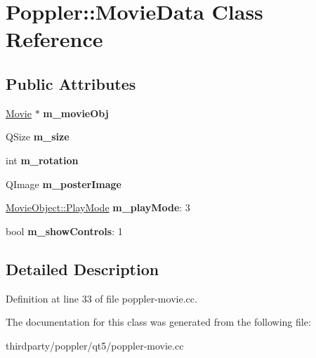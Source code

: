 \hypertarget{class_poppler_1_1_movie_data}{}\section{Poppler\+:\+:Movie\+Data Class Reference}
\label{class_poppler_1_1_movie_data}
\subsection*{Public Attributes}
\begin{DoxyCompactItemize}
\item 
\mbox{\label{class_poppler_1_1_movie_data_a9dbc6037efec1cd0784739c4bb499b8c}} 
\hyperlink{class_movie}{Movie} $\ast$ {\bfseries m\+\_\+movie\+Obj}
\item 
\mbox{\label{class_poppler_1_1_movie_data_ae611c8be596d31acaf6883129cecbdfc}} 
Q\+Size {\bfseries m\+\_\+size}
\item 
\mbox{\label{class_poppler_1_1_movie_data_af2af87347d713d1f974fde9eb1875d19}} 
int {\bfseries m\+\_\+rotation}
\item 
\mbox{\label{class_poppler_1_1_movie_data_af9d6741c568211beb8b4bd451e272abb}} 
Q\+Image {\bfseries m\+\_\+poster\+Image}
\item 
\mbox{\label{class_poppler_1_1_movie_data_a9a9088ee814ca2e1bcdf84bbf69be500}} 
\hyperlink{class_poppler_1_1_movie_object_adeb798fc202760b8fa27d7a8a5a0e9b3}{Movie\+Object\+::\+Play\+Mode} {\bfseries m\+\_\+play\+Mode}\+: 3
\item 
\mbox{\label{class_poppler_1_1_movie_data_a0c43e65048ac95c3b5d2b273c50f6a17}} 
bool {\bfseries m\+\_\+show\+Controls}\+: 1
\end{DoxyCompactItemize}


\subsection{Detailed Description}


Definition at line 33 of file poppler-\/movie.\+cc.



The documentation for this class was generated from the following file\+:\begin{DoxyCompactItemize}
\item 
thirdparty/poppler/qt5/poppler-\/movie.\+cc\end{DoxyCompactItemize}
